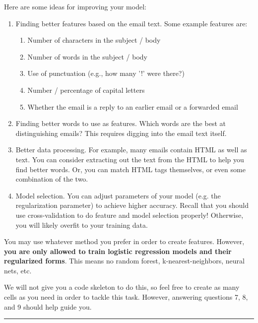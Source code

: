 \documentclass[11pt]{article}
\providecommand{\tightlist}{%
      \setlength{\itemsep}{0pt}\setlength{\parskip}{0pt}}
\begin{document}
Here are some ideas for improving your model:

\begin{enumerate}
\def\labelenumi{\arabic{enumi}.}
\tightlist
\item
  Finding better features based on the email text. Some example features
  are:

  \begin{enumerate}
  \def\labelenumii{\arabic{enumii}.}
  \tightlist
  \item
    Number of characters in the subject / body
  \item
    Number of words in the subject / body
  \item
    Use of punctuation (e.g., how many '!' were there?)
  \item
    Number / percentage of capital letters
  \item
    Whether the email is a reply to an earlier email or a forwarded
    email
  \end{enumerate}
\item
  Finding better words to use as features. Which words are the best at
  distinguishing emails? This requires digging into the email text
  itself.
\item
  Better data processing. For example, many emails contain HTML as well
  as text. You can consider extracting out the text from the HTML to
  help you find better words. Or, you can match HTML tags themselves, or
  even some combination of the two.
\item
  Model selection. You can adjust parameters of your model (e.g. the
  regularization parameter) to achieve higher accuracy. Recall that you
  should use cross-validation to do feature and model selection
  properly! Otherwise, you will likely overfit to your training data.
\end{enumerate}

You may use whatever method you prefer in order to create features.
However, \textbf{you are only allowed to train logistic regression
models and their regularized forms}. This means no random forest,
k-nearest-neighbors, neural nets, etc.

We will not give you a code skeleton to do this, so feel free to create
as many cells as you need in order to tackle this task. However,
answering questions 7, 8, and 9 should help guide you.

\begin{center}\rule{0.5\linewidth}{\linethickness}\end{center}
\end{document}
